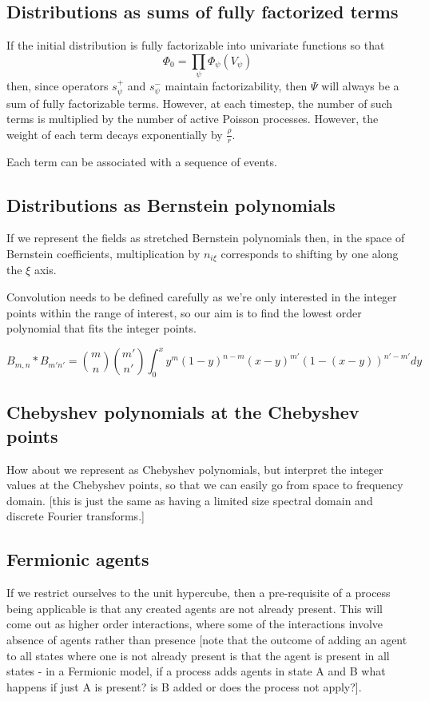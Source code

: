 \documentclass[a4paper]{article}
\begin{document}
\subsection{Distributions as sums of fully factorized terms}

If the initial distribution is fully factorizable into univariate functions so that
\[
\Phi_0 = \prod_\psi \Phi_\psi(V_\psi)
\]
then, since operators $s^+_\psi$ and $s^-_\psi$ maintain factorizability, then $\Psi$ will always be a sum of fully factorizable terms. However, at each timestep, the number of such terms is multiplied by the number of active Poisson processes. However, the weight of each term decays exponentially by $\frac{\rho}{r}$.

Each term can be associated with a sequence of events.


\subsection{Distributions as Bernstein polynomials}
If we represent the fields as stretched Bernstein polynomials then, in the space of Bernstein coefficients, multiplication by $n_{i\xi}$ corresponds to shifting by one along the $\xi$ axis.

Convolution needs to be defined carefully as we're only interested in the integer points within the range of interest, so our aim is to find the lowest order polynomial that fits the integer points.

\[
B_{m,n} \ast B_{m'n'} =   {m \choose n}{m' \choose n'} \int_{0}^x y^m(1-y)^{n-m} (x-y)^{m'}(1-(x-y))^{n'-m'} dy
\]

\subsection{Chebyshev polynomials at the Chebyshev points}
How about we represent as Chebyshev polynomials, but interpret the integer values at the Chebyshev points, so that we can easily go from space to frequency domain. [this is just the same as having a limited size spectral domain and discrete Fourier transforms.]

\subsection{Fermionic agents}

If we restrict ourselves to the unit hypercube, then a pre-requisite of a process being applicable is that any created agents are not already present. This will come out as higher order interactions, where some of the interactions involve absence of agents rather than presence [note that the outcome of adding an agent to all states where one is not already present is that the agent is present in all states - in a Fermionic model, if a process adds agents in state A and B what happens if just A is present? is B added or does the process not apply?].
\end{document}
